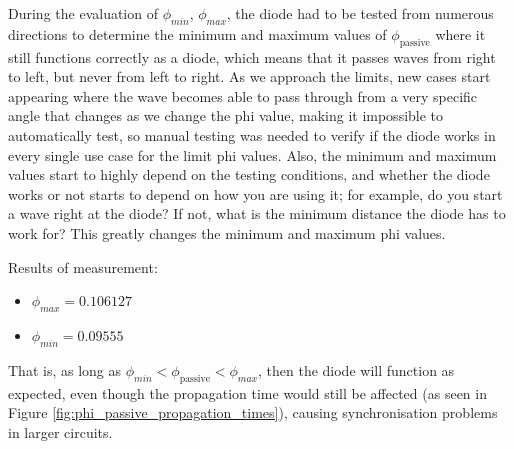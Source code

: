 During the evaluation of $\phi_{min}$, $\phi_{max}$, the diode had to be tested from numerous directions to determine the minimum and maximum values of $\phi_{\text{passive}}$ where it still functions correctly as a diode, which means that it passes waves from right to left, but never from left to right. As we approach the limits, new cases start appearing where the wave becomes able to pass through from a very specific angle that changes as we change the phi value, making it impossible to automatically test, so manual testing was needed to verify if the diode works in every single use case for the limit phi values. Also, the minimum and maximum values start to highly depend on the testing conditions, and whether the diode works or not starts to depend on how you are using it; for example, do you start a wave right at the diode? If not, what is the minimum distance the diode has to work for? This greatly changes the minimum and maximum phi values. 

Results of measurement: 
\begin{itemize}
    \item $\phi_{max} = 0.106127$
    \item $\phi_{min} = 0.09555$
\end{itemize}

That is, as long as $\phi_{min} < \phi_{\text{passive}} < \phi_{max}$, then the diode will function as expected, even though the propagation time would still be affected (as seen in Figure \ref{fig:phi_passive_propagation_times}), causing synchronisation problems in larger circuits.


